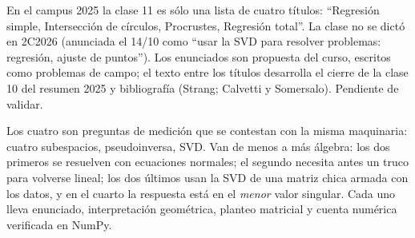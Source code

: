 \begin{atencion}[Anticipado]
En el campus 2025 la clase 11 es sólo una lista de cuatro títulos: ``Regresión simple,
Intersección de círculos, Procrustes, Regresión total''. La clase no se dictó en 2C2026
(anunciada el 14/10 como ``usar la SVD para resolver problemas: regresión, ajuste de
puntos''). Los enunciados son propuesta del curso, escritos como problemas de campo; el texto entre
los títulos desarrolla el cierre de la clase 10 del resumen 2025 y bibliografía
(Strang; Calvetti y Somersalo). Pendiente de validar.
\end{atencion}

Los cuatro son preguntas de medición que se contestan con la misma maquinaria: cuatro
subespacios, pseudoinversa, SVD. Van de menos a más álgebra: los dos primeros se resuelven
con ecuaciones normales; el segundo necesita antes un truco para volverse lineal; los dos
últimos usan la SVD de una matriz chica armada con los datos, y en el cuarto la respuesta
está en el \emph{menor} valor singular. Cada uno lleva enunciado, interpretación
geométrica, planteo matricial y cuenta numérica verificada en NumPy.

